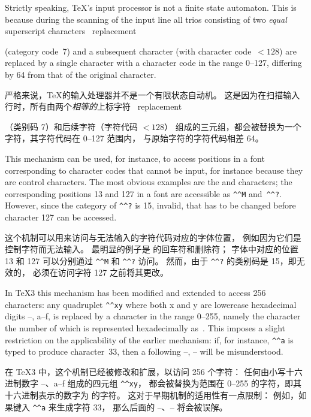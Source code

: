 Strictly speaking, \TeX's input processor
is not a finite state automaton.
This is because during the scanning of the input line
all trios consisting of two {\sl equal\/} superscript characters 
\term {}\ replacement\par
(category code~7) and a subsequent character
(with character code~$<128$)
are replaced by a single character with a character
code in the range 0--127,
differing by 64 from that of the original character.

严格来说，\TeX 的输入处理器并不是一个有限状态自动机。
这是因为在扫描输入行时，所有由两个{\sl 相等的}上标字符
\term {}\ replacement\par
（类别码 7）和后续字符（字符代码 $<128$）
组成的三元组，都会被替换为一个字符，其字符代码在 0--127 范围内，
与原始字符的字符代码相差 64。

This mechanism can be used, for instance, to access positions in a font
corresponding to character codes that cannot
be input, for instance because they are \ascii{} control characters.
The most obvious examples are the \ascii{} 
and  characters; the corresponding 
positions 13 and 127 in a font are
accessible as \verb>^^M> and~\verb>^^?>.
However, since the category of \verb>^^?> is 15, invalid,
that has to be changed before character 127 can be accessed.
\awp

这个机制可以用来访问与无法输入的字符代码对应的字体位置，
例如因为它们是 \ascii{} 控制字符而无法输入。
最明显的例子是 \ascii{} 的回车符和删除符；
字体中对应的位置 13 和 127 可以分别通过 \verb>^^M> 和 \verb>^^?> 访问。
然而，由于 \verb>^^?> 的类别码是 15，即无效的，
必须在访问字符 127 之前将其更改。
\awp

In \TeX3 this mechanism has been 
modified and extended to access 256 characters:
any quadruplet \verb-^^xy- where both \n x and \n y are lowercase
hexadecimal digits --, \n a--\n f, 
is replaced by a character in the
range 0--255, namely the character the number of which is
represented hexadecimally as~.
This imposes a slight restriction on the applicability
of the earlier mechanism: if, for instance, \verb>^^a>
is typed to produce character~33, then a following
--, -- will be misunderstood.

在 \TeX3 中，这个机制已经被修改和扩展，以访问 256 个字符：
任何由小写十六进制数字 --、\n a--\n f 组成的四元组 \verb-^^xy-，
都会被替换为范围在 0--255 的字符，即其十六进制表示的数字为  的字符。
这对于早期机制的适用性有一点限制：
例如，如果键入 \verb>^^a> 来生成字符 33，
那么后面的 --、-- 将会被误解。

